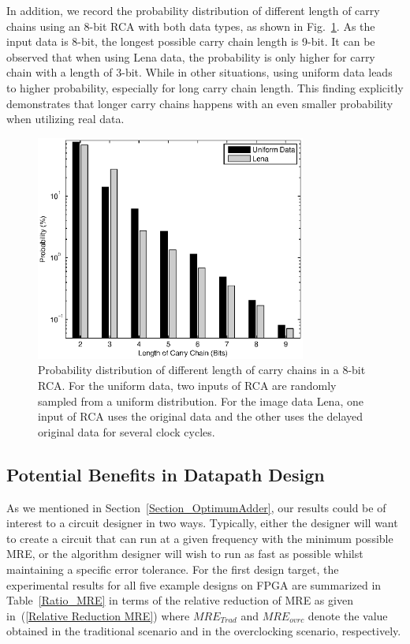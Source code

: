 \documentclass[prodmode,acmtrets]{acmsmall} %
\begin{document}
In addition, we record the probability distribution of different length of carry chains using an 8-bit RCA with both data types, as shown in Fig.~\ref{Fig_CarryDistribution}. As the input data is 8-bit, the longest possible carry chain length is 9-bit. It can be observed that when using Lena data,  the probability is only higher for carry chain with a length of 3-bit. While in other situations, using uniform data leads to higher probability, especially for long carry chain length. This finding explicitly demonstrates that longer carry chains happens with an even smaller probability when utilizing real data.

\begin{figure}[tbp]
  \centering
  \includegraphics[width=3.5in]{./Figures/CC_length2.eps}
  \caption{Probability distribution of different length of carry chains in a 8-bit RCA. For the uniform data, two inputs of RCA are randomly sampled from a uniform distribution. For the image data Lena, one input of RCA uses the original data and the other uses the delayed original data for several clock cycles.}
  \label{Fig_CarryDistribution}
\end{figure}

\subsection{Potential Benefits in Datapath Design}
As we mentioned in Section~\ref{Section_OptimumAdder}, our results could be of interest to a circuit designer in two ways. Typically, either the designer will want to create a circuit that can run at a given frequency with the minimum possible MRE, or the algorithm designer will wish to run as fast as possible whilst maintaining a specific error tolerance. For the first design target, the experimental results for all five example designs on FPGA are summarized in Table~\ref{Ratio_MRE} in terms of the relative reduction of MRE as given in~(\ref{Relative Reduction MRE}) where $MRE_{Trad}$ and $MRE_{ovrc}$ denote the value obtained in the traditional scenario and in the overclocking scenario, respectively.
\end{document}
